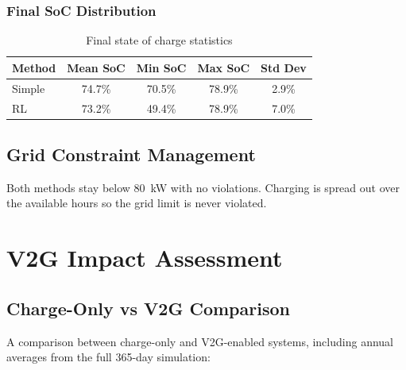 \subsubsection{Final SoC Distribution}

\begin{table}[H]
\centering
\caption{Final state of charge statistics}
\label{tab:final_soc}
\begin{tabular}{@{}lcccc@{}}
\toprule
\textbf{Method} & \textbf{Mean SoC} & \textbf{Min SoC} & \textbf{Max SoC} & \textbf{Std Dev} \\
\midrule
Simple & 74.7\% & 70.5\% & 78.9\% & 2.9\% \\
RL & 73.2\% & 49.4\% & 78.9\% & 7.0\% \\
\bottomrule
\end{tabular}
\end{table}

\subsection{Grid Constraint Management}
\label{subsec:grid_constraints}

Both methods stay below 80~kW with no violations. Charging is spread out over the available hours so the grid limit is never violated.

\section{V2G Impact Assessment}
\label{sec:v2g_impact}

\subsection{Charge-Only vs V2G Comparison}
\label{subsec:charge_vs_v2g}

A comparison between charge-only and V2G-enabled systems, including annual averages from the full 365-day simulation:

\begin{table}[H]
\centering
\caption{V2G impact on economic performance}
\label{tab:v2g_impact}
\end{table}

